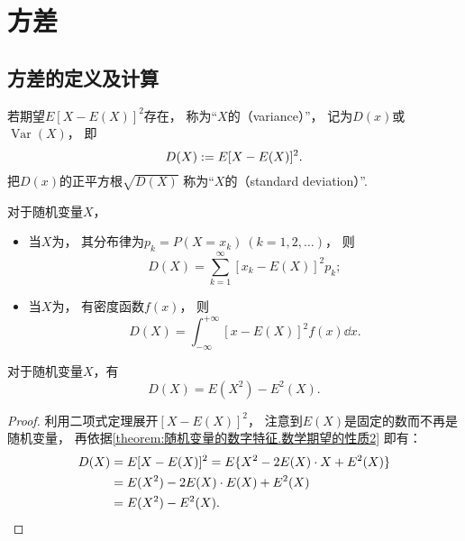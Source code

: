 \section{方差}
\subsection{方差的定义及计算}
\begin{definition}
若期望\(E[X-E(X)]^2\)存在，
称为“\(X\)的（variance）”，
记为\(D(x)\)或\(\operatorname{Var}(X)\)，
即\begin{equation}\label{equation:随机变量的数字特征.方差的定义式}
	D(X) := E[X-E(X)]^2.
\end{equation}
把\(D(x)\)的正平方根\(\sqrt{D(X)}\)
称为“\(X\)的（standard deviation）”.
\end{definition}

\begin{theorem}
对于随机变量\(X\)，
\begin{itemize}
	\item 当\(X\)为，
	其分布律为\(p_k = P(X=x_k)\ (k=1,2,\dotsc)\)，
	则\begin{equation}\label{equation:随机变量的数字特征.离散型方差的计算式}
		D(X) = \sum_{k=1}^\infty [x_k - E(X)]^2 p_k;
	\end{equation}

	\item 当\(X\)为，
	有密度函数\(f(x)\)，
	则\begin{equation}\label{equation:随机变量的数字特征.连续型方差的计算式}
		D(X) = \int_{-\infty}^{+\infty} [x - E(X)]^2 f(x) \dd{x}.
	\end{equation}
\end{itemize}
\end{theorem}

\begin{corollary}\label{theorem:随机变量的数字特征.常用的方差的计算式}
对于随机变量\(X\)，有\begin{equation}
	D(X) = E(X^2) - E^2(X).
\end{equation}
\begin{proof}
利用二项式定理展开\([X-E(X)]^2\)，
注意到\(E(X)\)是固定的数而不再是随机变量，
再依据\cref{theorem:随机变量的数字特征.数学期望的性质2} 即有：
\begin{align*}
	D(X) &= E[X-E(X)]^2
	= E\{X^2 - 2E(X) \cdot X + E^2(X)\} \\
	&= E(X^2) - 2E(X) \cdot E(X) + E^2(X) \\
	&= E(X^2) - E^2(X).
	\qedhere
\end{align*}
\end{proof}
\end{corollary}

